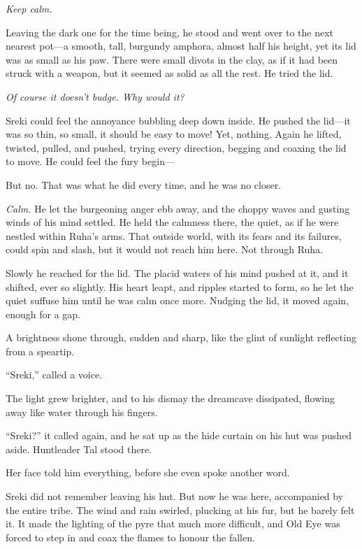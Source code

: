 \emph{Keep calm.}

Leaving the dark one for the time being, he stood and went over to the next nearest pot---a smooth, tall, burgundy amphora, almost half his height, yet its lid was as small as his paw. There were small divots in the clay, as if it had been struck with a weapon, but it seemed as solid as all the rest. He tried the lid.

\emph{Of course it doesn't budge. Why would it?}

Sreki could feel the annoyance bubbling deep down inside. He pushed the lid---it was so thin, so small, it should be easy to move! Yet, nothing. Again he lifted, twisted, pulled, and pushed, trying every direction, begging and coaxing the lid to move. He could feel the fury begin---

But no. That was what he did every time, and he was no closer.

\emph{Calm.} He let the burgeoning anger ebb away, and the choppy waves and gusting winds of his mind settled. He held the calmness there, the quiet, as if he were nestled within Ruha's arms. That outside world, with its fears and its failures, could spin and slash, but it would not reach him here. Not through Ruha.

Slowly he reached for the lid. The placid waters of his mind pushed at it, and it shifted, ever so slightly. His heart leapt, and ripples started to form, so he let the quiet suffuse him until he was calm once more. Nudging the lid, it moved again, enough for a gap.

A brightness shone through, sudden and sharp, like the glint of sunlight reflecting from a speartip.

``Sreki,'' called a voice.

The light grew brighter, and to his dismay the dreamcave dissipated, flowing away like water through his fingers.

``Sreki?'' it called again, and he sat up as the hide curtain on his hut was pushed aside. Huntleader Tal stood there.

Her face told him everything, before she even spoke another word.

\secdiv

Sreki did not remember leaving his hut. But now he was here, accompanied by the entire tribe. The wind and rain swirled, plucking at his fur, but he barely felt it. It made the lighting of the pyre that much more difficult, and Old Eye was forced to step in and coax the flames to honour the fallen.

